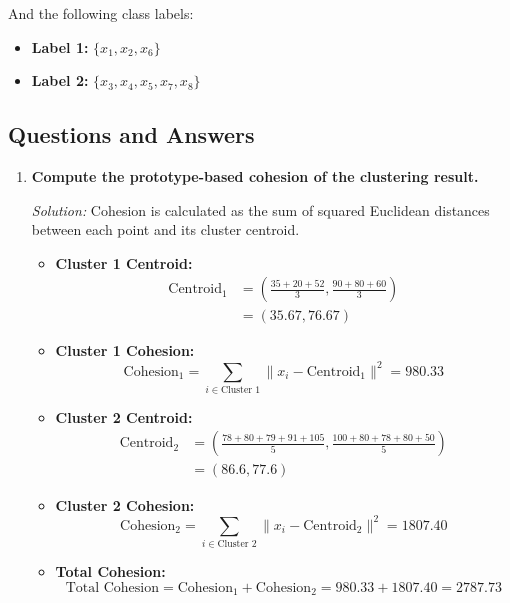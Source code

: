\documentclass{article}
\begin{document}
And the following class labels:

\begin{itemize}
    \item \textbf{Label 1:} $\{ x_1, x_2, x_6 \}$
    \item \textbf{Label 2:} $\{ x_3, x_4, x_5, x_7, x_8 \}$
\end{itemize}

\subsection*{Questions and Answers}

\begin{enumerate}[label=(\roman*)]
    \item \textbf{Compute the prototype-based cohesion of the clustering result.}

    \textit{Solution:} Cohesion is calculated as the sum of squared Euclidean distances between each point and its cluster centroid.

    \begin{itemize}
        \item \textbf{Cluster 1 Centroid:} 
        \[
        \begin{split}
            \text{Centroid}_1 &= \left( \frac{35 + 20 + 52}{3}, \frac{90 + 80 + 60}{3} \right) \\
            &= (35.67, 76.67)
        \end{split}
        \]
        \item \textbf{Cluster 1 Cohesion:}
        \[
        \text{Cohesion}_1 = \sum_{i \in \text{Cluster 1}} \| x_i - \text{Centroid}_1 \|^2 = 980.33
        \]
        \item \textbf{Cluster 2 Centroid:} 
        \[
        \begin{split}
            \text{Centroid}_2 &= \left( \frac{78 + 80 + 79 + 91 + 105}{5}, \frac{100 + 80 + 78 + 80 + 50}{5} \right) \\
            &= (86.6, 77.6)
        \end{split}
        \]
        \item \textbf{Cluster 2 Cohesion:}
        \[
        \text{Cohesion}_2 = \sum_{i \in \text{Cluster 2}} \| x_i - \text{Centroid}_2 \|^2 = 1807.40
        \]
        \item \textbf{Total Cohesion:}
        \[
        \text{Total Cohesion} = \text{Cohesion}_1 + \text{Cohesion}_2 = 980.33 + 1807.40 = 2787.73
        \]
    \end{itemize}


\end{enumerate}
\end{document}
